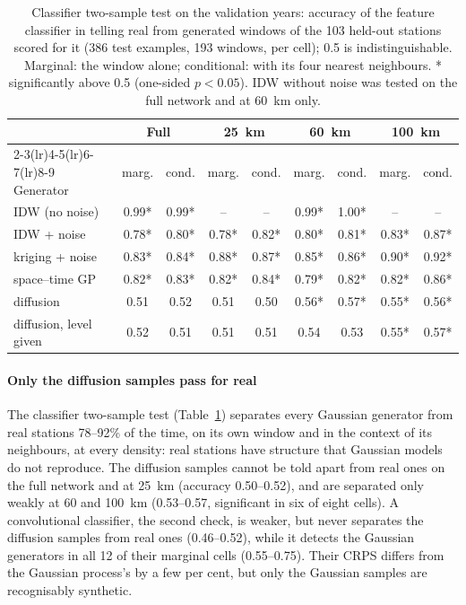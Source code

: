 \documentclass[preprint,12pt,authoryear]{elsarticle}
\begin{document}
\begin{table}[t]
  \centering
  \caption{Classifier two-sample test on the validation years: accuracy of the feature
    classifier in telling real from generated windows of the 103 held-out stations scored
    for it (386 test examples, 193 windows, per cell); 0.5 is indistinguishable. Marginal:
    the window alone; conditional: with its four nearest neighbours. * significantly above
  0.5 (one-sided $p < 0.05$). IDW without noise was tested on the full network and at 60~km only.}
  \label{tab:c2st}
  \footnotesize
  \setlength{\tabcolsep}{3pt}
  \begin{tabular}{lcccccccc}
    \toprule
    & \multicolumn{2}{c}{Full} & \multicolumn{2}{c}{25~km} & \multicolumn{2}{c}{60~km} &
    \multicolumn{2}{c}{100~km} \\
    \cmidrule(lr){2-3}\cmidrule(lr){4-5}\cmidrule(lr){6-7}\cmidrule(lr){8-9}
    Generator & marg. & cond. & marg. & cond. & marg. & cond. & marg. & cond. \\
    \midrule
    IDW (no noise) & 0.99* & 0.99* & -- & -- & 0.99* & 1.00* & -- & -- \\
    IDW + noise & 0.78* & 0.80* & 0.78* & 0.82* & 0.80* & 0.81* & 0.83* & 0.87* \\
    kriging + noise & 0.83* & 0.84* & 0.88* & 0.87* & 0.85* & 0.86* & 0.90* & 0.92* \\
    space--time GP & 0.82* & 0.83* & 0.82* & 0.84* & 0.79* & 0.82* & 0.82* & 0.86* \\
    diffusion & 0.51 & 0.52 & 0.51 & 0.50 & 0.56* & 0.57* & 0.55* & 0.56* \\
    diffusion, level given & 0.52 & 0.51 & 0.51 & 0.51 & 0.54 & 0.53 & 0.55* & 0.57* \\
    \bottomrule
  \end{tabular}
\end{table}

\paragraph{Only the diffusion samples pass for real} The classifier two-sample test
(Table~\ref{tab:c2st}) separates every Gaussian generator from real stations 78--92\% of
the time, on its own window and in the context of its neighbours, at every density: real
stations have structure that Gaussian models do not reproduce. The diffusion samples
cannot be told apart from real ones on the full network and at 25~km (accuracy
0.50--0.52), and are separated only weakly at 60 and 100~km (0.53--0.57, significant in
six of eight cells). A convolutional classifier, the second check, is weaker, but never
separates the diffusion samples from real ones (0.46--0.52), while it detects the
Gaussian generators in all 12 of their marginal cells (0.55--0.75). Their CRPS differs
from the Gaussian process's by a few per cent, but only the Gaussian samples are
recognisably synthetic.
\end{document}
